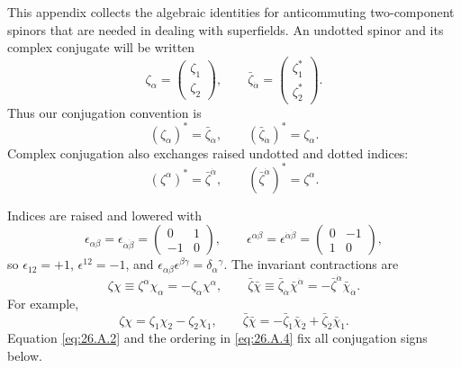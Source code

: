 

This appendix collects the algebraic identities for anticommuting
two-component spinors that are needed in dealing with superfields.  An
undotted spinor and its complex conjugate will be written
\[
  \zeta_\alpha=
  \begin{pmatrix}\zeta_1\\ \zeta_2\end{pmatrix},
  \qquad
  \bar\zeta_{\dot\alpha}=
  \begin{pmatrix}\zeta_1^*\\ \zeta_2^*\end{pmatrix}.
\]
Thus our conjugation convention is
\begin{equation}
  (\zeta_\alpha)^*=\bar\zeta_{\dot\alpha},
  \qquad
  (\bar\zeta_{\dot\alpha})^*=\zeta_\alpha .
  \tag{26.A.1}\label{eq:26.A.1}
\end{equation}
Complex conjugation also exchanges raised undotted and dotted indices:
\begin{equation}
  (\zeta^\alpha)^*=\bar\zeta^{\dot\alpha},
  \qquad
  (\bar\zeta^{\dot\alpha})^*=\zeta^\alpha .
  \tag{26.A.2}\label{eq:26.A.2}
\end{equation}

Indices are raised and lowered with
\begin{equation}
  \epsilon_{\alpha\beta}
  =\epsilon_{\dot\alpha\dot\beta}
  =
  \begin{pmatrix}0&1\\-1&0\end{pmatrix},
  \qquad
  \epsilon^{\alpha\beta}
  =\epsilon^{\dot\alpha\dot\beta}
  =
  \begin{pmatrix}0&-1\\1&0\end{pmatrix},
  \tag{26.A.3}\label{eq:26.A.3}
\end{equation}
so \(\epsilon_{12}=+1\), \(\epsilon^{12}=-1\), and
\(\epsilon_{\alpha\beta}\epsilon^{\beta\gamma}
=\delta_\alpha{}^\gamma\).  The invariant contractions are
\begin{equation}
  \zeta\chi\equiv\zeta^\alpha\chi_\alpha
  =-\zeta_\alpha\chi^\alpha,
  \qquad
  \bar\zeta\bar\chi
  \equiv\bar\zeta_{\dot\alpha}\bar\chi^{\dot\alpha}
  =-\bar\zeta^{\dot\alpha}\bar\chi_{\dot\alpha}.
  \tag{26.A.4}\label{eq:26.A.4}
\end{equation}
For example,
\[
  \zeta\chi
  =\zeta_1\chi_2-\zeta_2\chi_1,
  \qquad
  \bar\zeta\bar\chi
  =-\bar\zeta_{\dot1}\bar\chi_{\dot2}
   +\bar\zeta_{\dot2}\bar\chi_{\dot1}.
\]
Equation \eqref{eq:26.A.2} and the ordering in
\eqref{eq:26.A.4} fix all conjugation signs below.

